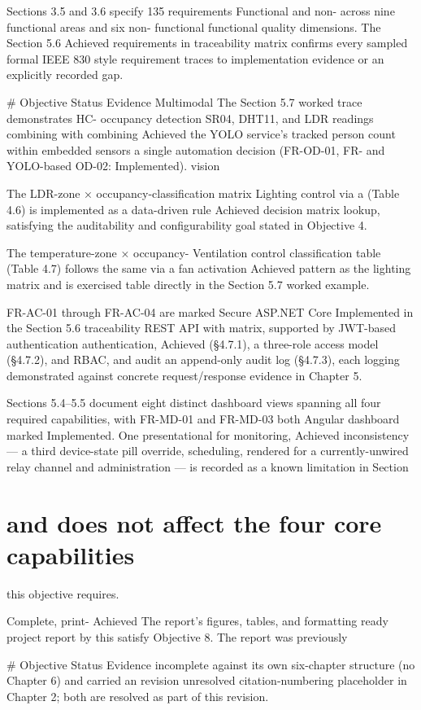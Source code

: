 Sections 3.5 and 3.6 specify 135 requirements
Functional and non- across nine functional areas and six non-
functional functional quality dimensions. The Section 5.6
Achieved
requirements in traceability matrix confirms every sampled
formal IEEE 830 style requirement traces to implementation evidence
or an explicitly recorded gap.


# Objective Status Evidence
Multimodal
The Section 5.7 worked trace demonstrates HC-
occupancy detection
SR04, DHT11, and LDR readings combining with
combining
Achieved the YOLO service's tracked person count within
embedded sensors
a single automation decision (FR-OD-01, FR-
and YOLO-based
OD-02: Implemented).
vision

The LDR-zone × occupancy-classification matrix
Lighting control via a (Table 4.6) is implemented as a data-driven rule
Achieved
decision matrix lookup, satisfying the auditability and
configurability goal stated in Objective 4.

The temperature-zone × occupancy-
Ventilation control
classification table (Table 4.7) follows the same
via a fan activation Achieved
pattern as the lighting matrix and is exercised
table
directly in the Section 5.7 worked example.

FR-AC-01 through FR-AC-04 are marked
Secure ASP.NET Core Implemented in the Section 5.6 traceability
REST API with matrix, supported by JWT-based authentication
authentication, Achieved (§4.7.1), a three-role access model (§4.7.2), and
RBAC, and audit an append-only audit log (§4.7.3), each
logging demonstrated against concrete
request/response evidence in Chapter 5.

Sections 5.4--5.5 document eight distinct
dashboard views spanning all four required
capabilities, with FR-MD-01 and FR-MD-03 both
Angular dashboard
marked Implemented. One presentational
for monitoring,
Achieved inconsistency --- a third device-state pill
override, scheduling,
rendered for a currently-unwired relay channel
and administration
--- is recorded as a known limitation in Section
\section{and does not affect the four core capabilities}

this objective requires.

Complete, print- Achieved The report's figures, tables, and formatting
ready project report by this satisfy Objective 8. The report was previously

# Objective Status Evidence
incomplete against its own six-chapter
structure (no Chapter 6) and carried an
revision unresolved citation-numbering placeholder in
Chapter 2; both are resolved as part of this
revision.


